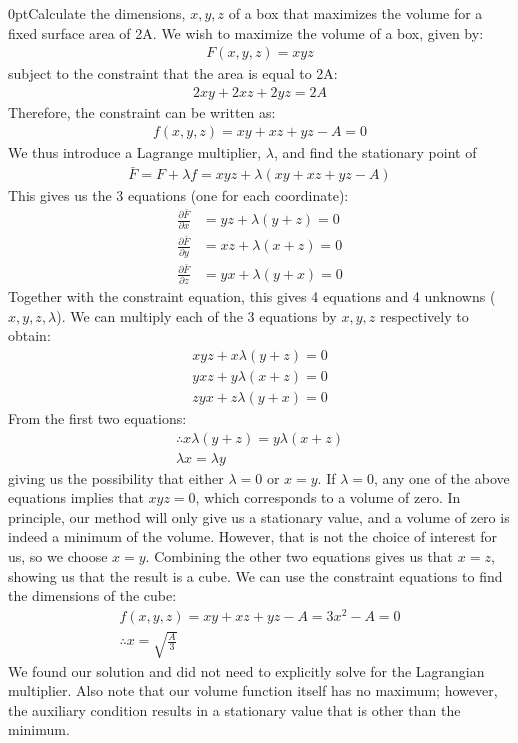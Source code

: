 \begin{example}{0pt}{Calculate the dimensions, $x,y,z$ of a box that maximizes the volume for a fixed surface area of 2A.}{}
We wish to maximize the volume of a box, given by:
\begin{align*}
F(x,y,z)=xyz
\end{align*}
subject to the constraint that the area is equal to 2A:
\begin{align*}
2xy+2xz+2yz=2A
\end{align*}
Therefore, the constraint can be written as:
\begin{align*}
f(x,y,z)=xy+xz+yz-A=0
\end{align*}
We thus introduce a Lagrange multiplier, $\lambda$, and find the stationary point of
\begin{align*}
\bar{F}=F+\lambda f= xyz+\lambda(xy+xz+yz-A)
\end{align*}
This gives us the 3 equations (one for each coordinate):
\begin{align*}
\frac{\partial \bar{F}}{\partial x}&=yz+\lambda(y+z)=0\\
\frac{\partial \bar{F}}{\partial y}&=xz+\lambda(x+z)=0\\
\frac{\partial \bar{F}}{\partial z}&=yx+\lambda(y+x)=0
\end{align*}
Together with the constraint equation, this gives 4 equations and 4 unknowns ($x,y,z,\lambda$). We can multiply each of the 3 equations by $x,y,z$ respectively to obtain:
\begin{align*}
xyz+x\lambda(y+z)=0\\
yxz+y\lambda(x+z)=0\\
zyx+z\lambda(y+x)=0
\end{align*}
From the first two equations:
\begin{align*}
\therefore x\lambda(y+z)=y\lambda(x+z)\\
\lambda x= \lambda y
\end{align*}
giving us the possibility that either $\lambda=0$ or $x=y$. If $\lambda=0$, any one of the above equations implies that $xyz=0$, which corresponds to a volume of zero. In principle, our method will only give us a stationary value, and a volume of zero is indeed a minimum of the volume. However, that is not the choice of interest for us, so we choose $x=y$. Combining the other two equations gives us that $x=z$, showing us that the result is a cube. We can use the constraint equations to find the dimensions of the cube:
\begin{align*}
f(x,y,z)=xy+xz+yz-A=3x^2-A=0\nonumber\\
\therefore x=\sqrt{\frac{A}{3}}
\end{align*}
We found our solution and did not need to explicitly solve for the Lagrangian multiplier. Also note that our volume function itself has no maximum; however, the auxiliary condition results in a stationary value that is other than the minimum.
\label{ex:boxvolume}
\end{example}


